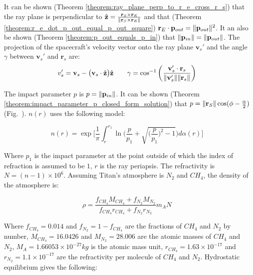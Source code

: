 \documentclass{article}
\begin{document}
            It can be shown (Theorem \ref{theorem:ray_plane_perp_to_r_e_cross_r_s}) that the ray plane is perpendicular to $\hat{\mathbf{z}} = \frac{\mathbf{r}_{S}\times \mathbf{r}_{E}}{\lVert\mathbf{r}_{S}\times \mathbf{r}_{E}\rVert}$ and that (Theorem \ref{theorem:r_e_dot_p_out_equal_p_out_square}) $\mathbf{r}_{E}\cdot \mathbf{p}_{out} = \lVert\mathbf{p}_{out}\rVert^2$. It an also be shown (Theorem \ref{theorem:p_out_equals_p_in}) that $\lVert\mathbf{p}_{in}\rVert=\lVert\mathbf{p}_{out}\rVert$. The projection of the spacecraft's velocity vector onto the ray plane $\mathbf{v}_{s}'$ and the angle $\gamma$ between $\mathbf{v}_{s}'$ and $\mathbf{r}_{s}$ are:
            \begin{equation}
            v_{s}' = \mathbf{v}_{s} - \big(\mathbf{v}_{s}\cdot \hat{\mathbf{z}}\big) \hat{\mathbf{z}}\quad \quad \gamma = \cos^{-1}\bigg(\frac{\mathbf{v}_{s}'\cdot \mathbf{r}_{s}}{\lVert\mathbf{v}_{s}'\rVert \lVert\mathbf{r}_{s}\rVert}\bigg)
            \end{equation}
            
            \noindent The impact parameter $p$ is $p=\lVert\mathbf{p}_{in}\rVert$. It can be shown (Theorem \ref{theorem:impact_parameter_p_closed_form_solution}) that $p = \lVert\mathbf{r}_{S}\rVert\cos(\phi - \frac{\alpha}{2})$ (Fig.~). $n(r)$ uses the following model:
            
            \begin{equation}
            n(r) = \exp\bigg[\frac{1}{\pi}\int_{r}^{r_1}\ln\bigg(\frac{p}{p_1}+\sqrt{\big(\frac{p}{p_1}\big)^2 - 1}\bigg)d\alpha(r)\bigg]
            \end{equation}
            
            \noindent Where $p_1$ is the impact parameter at the point outside of which the index of refraction is assumed to be $1$, $r$ is the \gls{ray periapsis}. The refractivity is $N=(n-1)\times 10^6$. Assuming Titan's atmosphere is $N_2$ and $CH_4$, the density of the atmosphere is:
            
            \begin{equation}
            \rho = \frac{f_{CH_4}M_{CH_4}+f_{N_2}M_{N_2}}{f_{CH_4}r_{CH_4}+f_{N_2}r_{N_2}}m_{A}N
            \end{equation}
            
            \noindent Where $f_{CH_4} = 0.014$ and $f_{N_2} = 1-f_{CH_4}$ are the fractions of $CH_{4}$ and $N_{2}$ by number, $M_{CH_4} = 16.0426$ and $M_{N_2} = 28.006$ are the atomic masses of $CH_{4}$ and $N_2$, $M_{A} = 1.66053\times 10^{-27}kg$ is the atomic mass unit, $r_{CH_4} = 1.63\times 10^{-17}$ and $r_{N_2} = 1.1\times 10^{-17}$ are the refractivity per molecule of $CH_{4}$ and $N_2$. Hydrostatic equilibrium gives the following:
            
\end{document}
